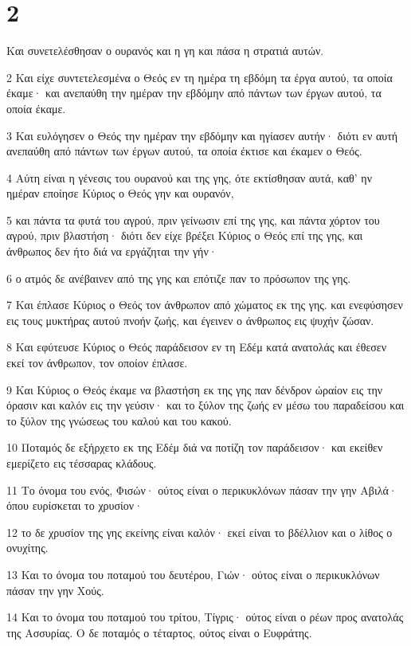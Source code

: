 \chapter{2}

\par Και συνετελέσθησαν ο ουρανός και η γη και πάσα η στρατιά αυτών.
\par 2 Και είχε συντετελεσμένα ο Θεός εν τη ημέρα τη εβδόμη τα έργα αυτού, τα οποία έκαμε· και ανεπαύθη την ημέραν την εβδόμην από πάντων των έργων αυτού, τα οποία έκαμε.
\par 3 Και ευλόγησεν ο Θεός την ημέραν την εβδόμην και ηγίασεν αυτήν· διότι εν αυτή ανεπαύθη από πάντων των έργων αυτού, τα οποία έκτισε και έκαμεν ο Θεός.
\par 4 Αύτη είναι η γένεσις του ουρανού και της γης, ότε εκτίσθησαν αυτά, καθ' ην ημέραν εποίησε Κύριος ο Θεός γην και ουρανόν,
\par 5 και πάντα τα φυτά του αγρού, πριν γείνωσιν επί της γης, και πάντα χόρτον του αγρού, πριν βλαστήση· διότι δεν είχε βρέξει Κύριος ο Θεός επί της γης, και άνθρωπος δεν ήτο διά να εργάζηται την γήν·
\par 6 ο ατμός δε ανέβαινεν από της γης και επότιζε παν το πρόσωπον της γης.
\par 7 Και έπλασε Κύριος ο Θεός τον άνθρωπον από χώματος εκ της γης. και ενεφύσησεν εις τους μυκτήρας αυτού πνοήν ζωής, και έγεινεν ο άνθρωπος εις ψυχήν ζώσαν.
\par 8 Και εφύτευσε Κύριος ο Θεός παράδεισον εν τη Εδέμ κατά ανατολάς και έθεσεν εκεί τον άνθρωπον, τον οποίον έπλασε.
\par 9 Και Κύριος ο Θεός έκαμε να βλαστήση εκ της γης παν δένδρον ώραίον εις την όρασιν και καλόν εις την γεύσιν· και το ξύλον της ζωής εν μέσω του παραδείσου και το ξύλον της γνώσεως του καλού και του κακού.
\par 10 Ποταμός δε εξήρχετο εκ της Εδέμ διά να ποτίζη τον παράδεισον· και εκείθεν εμερίζετο εις τέσσαρας κλάδους.
\par 11 Το όνομα του ενός, Φισών· ούτος είναι ο περικυκλόνων πάσαν την γην Αβιλά· όπου ευρίσκεται το χρυσίον·
\par 12 το δε χρυσίον της γης εκείνης είναι καλόν· εκεί είναι το βδέλλιον και ο λίθος ο ονυχίτης.
\par 13 Και το όνομα του ποταμού του δευτέρου, Γιών· ούτος είναι ο περικυκλόνων πάσαν την γην Χούς.
\par 14 Και το όνομα του ποταμού του τρίτου, Τίγρις· ούτος είναι ο ρέων προς ανατολάς της Ασσυρίας. Ο δε ποταμός ο τέταρτος, ούτος είναι ο Ευφράτης.
